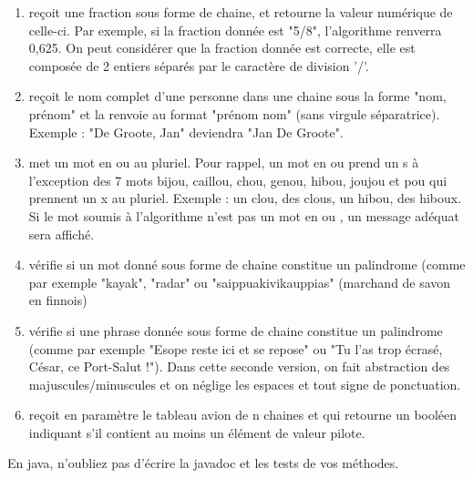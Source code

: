 \documentclass[11pt,a4paper]{article}
\begin{document}
					\begin{enumerate}
				
			\item  re\c coit une fraction sous forme de chaine, et retourne la valeur
              num\'erique de celle-ci. Par exemple, si la fraction donn\'ee est "5/8", l'algorithme renverra
              0,625. On peut consid\'erer que la fraction donn\'ee est correcte, elle est compos\'ee de 2 entiers
              s\'epar\'es par le caract\`ere de division '/'.
            
			\item 
              re\c coit le nom complet d'une personne dans une chaine sous la forme
              "nom, pr\'enom" et la renvoie au format "pr\'enom nom" (sans virgule s\'eparatrice). Exemple :
              "De Groote, Jan" deviendra "Jan De Groote".
            
			\item 
              met un mot en \guillemotleft  ou \guillemotright  au pluriel. Pour rappel, un mot en \guillemotleft  ou \guillemotright 
              prend un \guillemotleft  s \guillemotright  \`a l'exception des 7 mots bijou, caillou, chou, genou, hibou, joujou et pou qui
              prennent un \guillemotleft  x \guillemotright  au pluriel. Exemple : un clou, des clous, un hibou, des hiboux. Si le mot
              soumis \`a l'algorithme n'est pas un mot en \guillemotleft  ou \guillemotright , un message ad\'equat sera affich\'e.
              
			\item 
              v\'erifie si un mot donn\'e sous forme de chaine constitue un
              palindrome (comme par exemple "kayak", "radar" ou "saippuakivikauppias" (marchand
              de savon en finnois)
            
			\item 
              v\'erifie si une phrase donn\'ee sous forme de chaine constitue
              un palindrome (comme par exemple "Esope reste ici et se repose" ou "Tu l'as trop
              \'ecras\'e, C\'esar, ce Port-Salut !"). Dans cette seconde version, on fait abstraction des
              majuscules/minuscules et on n\'eglige les espaces et tout signe de ponctuation.
            
			\item 
              re\c coit en param\`etre le tableau avion de n chaines et qui retourne un
              bool\'een indiquant s'il contient au moins un \'el\'ement de valeur \guillemotleft pilote\guillemotright .
            
					\end{enumerate}
				
            \par
        En java, n'oubliez pas d'\'ecrire la javadoc et les tests de vos m\'ethodes.
            \par
        
				
\end{document}
